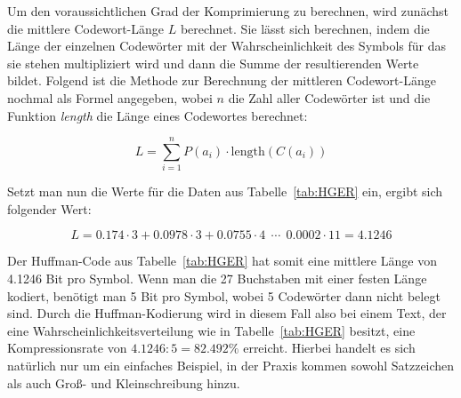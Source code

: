 \documentclass[twoside,11pt,a4paper]{article}
\theoremstyle{break}
\begin{document}
Um den voraussichtlichen Grad der Komprimierung zu berechnen, wird
zunächst die mittlere Codewort-Länge $L$ berechnet. Sie lässt sich
berechnen, indem die Länge der einzelnen Codewörter mit der
Wahrscheinlichkeit des Symbols für das sie stehen multipliziert wird
und dann die Summe der resultierenden Werte bildet. Folgend ist die
Methode zur Berechnung der mittleren Codewort-Länge nochmal als Formel
angegeben, wobei $n$ die Zahl aller Codewörter ist und die
Funktion \emph{length} die Länge eines Codewortes berechnet:

\begin{equation}
L = \sum_{i=1}^{n} P(a_i) \cdot \mathrm{length}(C(a_i))
\end{equation}

Setzt man nun die Werte für die Daten aus Tabelle~\ref{tab:HGER} ein,
ergibt sich folgender Wert:

\begin{equation}
L = 0.174 \cdot 3 + 0.0978 \cdot 3 + 0.0755 \cdot 4\ \ \cdots\ \ 0.0002 \cdot 11 = 4.1246
\end{equation}

Der Huffman-Code aus Tabelle~\ref{tab:HGER} hat somit eine mittlere
Länge von 4.1246 Bit pro Symbol. Wenn man die 27 Buchstaben mit einer
festen Länge kodiert, benötigt man 5 Bit pro Symbol, wobei 5
Codewörter dann nicht belegt sind. Durch die Huffman-Kodierung wird in
diesem Fall also bei einem Text, der eine
Wahrscheinlichkeitsverteilung wie in Tabelle~\ref{tab:HGER} besitzt,
eine Kompressionsrate von $4.1246 : 5 = 82.492 \%$ erreicht. Hierbei
handelt es sich natürlich nur um ein einfaches Beispiel, in der Praxis
kommen sowohl Satzzeichen als auch Groß- und Kleinschreibung hinzu.
\end{document}
